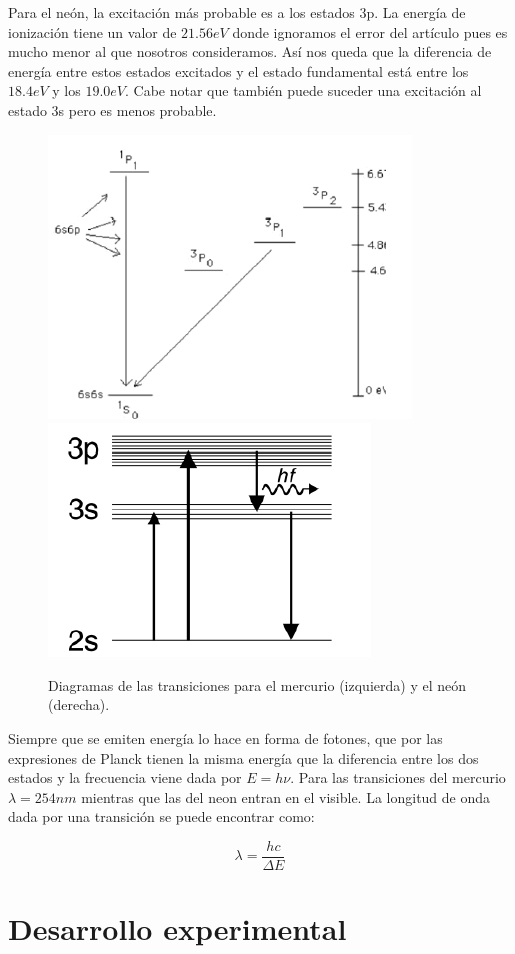\documentclass{article}
\begin{document}
Para el neón, la excitación más probable es a los estados 3p. La energía de ionización tiene un valor de $21.56eV$ donde ignoramos el error del artículo pues es mucho menor al que nosotros consideramos. Así nos queda que la diferencia de energía entre estos estados excitados y el estado fundamental está entre los $18.4eV$ y los $19.0eV$\cite{Neon}. Cabe notar que también puede suceder una excitación al estado 3s pero es menos probable.

\begin{figure}[h!]
\begin{center}
\includegraphics[max width=0.49\linewidth]{HgTeo.png}
\includegraphics[max width=0.49\linewidth]{NeTeo.png}
\caption{Diagramas de las transiciones para el mercurio (izquierda) y el neón (derecha).}
\end{center}
\end{figure}

Siempre que se emiten energía lo hace en forma de fotones, que por las expresiones de Planck tienen la misma energía que la diferencia entre los dos estados y la frecuencia viene dada por $E = h \nu$. Para las transiciones del mercurio $\lambda = 254nm$ mientras que las del neon entran en el visible. La longitud de onda dada por una transición se puede encontrar como:

\begin{equation}
\lambda = \frac{hc}{\Delta E}
\label{eq:lambda}
\end{equation}

\section{Desarrollo experimental}
\end{document}
